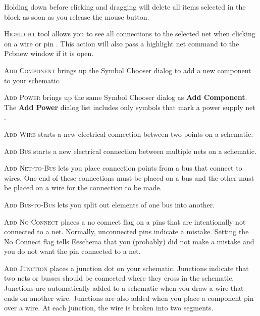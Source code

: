 Holding down \keys{\ctrl+\shift} before clicking and dragging will delete all items selected in the block as soon as you release the mouse button.

\textsc{Highlight} tool allows you to see all connections to the selected net when clicking on a wire or pin
	.
This action will also pass a highlight net command to the Pcbnew window if it is open.

\textsc{Add Component} brings up the Symbol Chooser dialog to add a new component to your schematic.

\textsc{Add Power} brings up the same Symbol Chooser dialog as \textbf{Add Component}.
The \textbf{Add Power} dialog list includes only symbols that mark a power supply net
	.

\textsc{Add Wire} starts a new electrical connection between two points on a schematic.

\textsc{Add Bus} starts a new electrical connection between multiple nets on a schematic.

\textsc{Add Net-to-Bus} lets you place connection points from a bus that connect to wires.
One end of these connections must be placed on a bus and the other must be placed on a wire for the connection to be made.

\textsc{Add Bus-to-Bus} lets you split out elements of one bus into another.

\textsc{Add No Connect} places a no connect flag on a pins that are intentionally not connected to a net.
Normally, unconnected pins indicate a mistake.
Setting the No Connect flag tells Eeschema that you (probably) did not make a mistake and you do not want the pin connected to a net.

\textsc{Add Junction} places a junction dot on your schematic.
Junctions indicate that two nets or busses should be connected where they cross in the schematic.
Junctions are automatically added to a schematic when you draw a wire that ends on another wire.
Junctions are also added when you place a component pin over a wire.
At each junction, the wire is broken into two segments.

